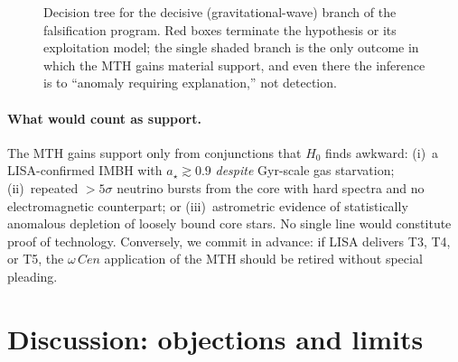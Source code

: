 \documentclass[11pt]{article}
\newcommand{\msun}{M_\odot}
\newcommand{\acen}{\ensuremath{\omega}\,Cen}
\newcommand{\astar}{a_\star}
\begin{document}
\begin{figure}[t]
\centering
{}
\caption{Decision tree for the decisive (gravitational-wave) branch of the falsification program. Red boxes terminate the hypothesis or its exploitation model; the single shaded branch is the only outcome in which the MTH gains material support, and even there the inference is to ``anomaly requiring explanation,'' not detection.}
\label{fig:tree}
\end{figure}

\paragraph{What would count as support.} The MTH gains support only from conjunctions that $H_0$ finds awkward: (i)~a LISA-confirmed IMBH with $\astar \gtrsim 0.9$ \emph{despite} Gyr-scale gas starvation; (ii)~repeated ${>}5\sigma$ neutrino bursts from the core with hard spectra and no electromagnetic counterpart; or (iii)~astrometric evidence of statistically anomalous depletion of loosely bound core stars. No single line would constitute proof of technology. Conversely, we commit in advance: if LISA delivers T3, T4, or T5, the $\acen$ application of the MTH should be retired without special pleading.

\section{Discussion: objections and limits}\label{sec:discussion}
\end{document}
